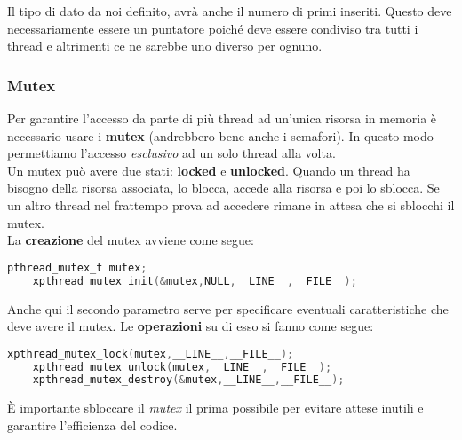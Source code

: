 \begin{note}
	Il tipo di dato da noi definito, avrà anche il numero di primi inseriti. Questo deve necessariamente essere un puntatore poiché deve essere condiviso tra tutti i thread e altrimenti ce ne sarebbe uno diverso per ognuno.
\end{note}
\subsubsection{Mutex}
Per garantire l'accesso da parte di più thread ad un'unica risorsa in memoria è necessario usare i \textbf{mutex} (andrebbero bene anche i semafori). In questo modo permettiamo l'accesso \emph{esclusivo} ad un solo thread alla volta.\\
Un mutex può avere due stati: \textbf{locked} e \textbf{unlocked}. Quando un thread ha bisogno della risorsa associata, lo blocca, accede alla risorsa e poi lo sblocca. Se un altro thread nel frattempo prova ad accedere rimane in attesa che si sblocchi il mutex.\\
La \textbf{creazione} del mutex avviene come segue:
\begin{lstlisting}[language=C]
	pthread_mutex_t mutex;
	xpthread_mutex_init(&mutex,NULL,__LINE__,__FILE__);
\end{lstlisting}
Anche qui il secondo parametro serve per specificare eventuali caratteristiche che deve avere il mutex. Le \textbf{operazioni} su di esso si fanno come segue:
\begin{lstlisting}[language=C]
	xpthread_mutex_lock(mutex,__LINE__,__FILE__);
	xpthread_mutex_unlock(mutex,__LINE__,__FILE__);
	xpthread_mutex_destroy(&mutex,__LINE__,__FILE__);
\end{lstlisting}

\begin{note}
	\label{note:mutex_efficiency}
	È importante sbloccare il \emph{mutex} il prima possibile per evitare attese inutili e garantire l'efficienza del codice.
\end{note}

